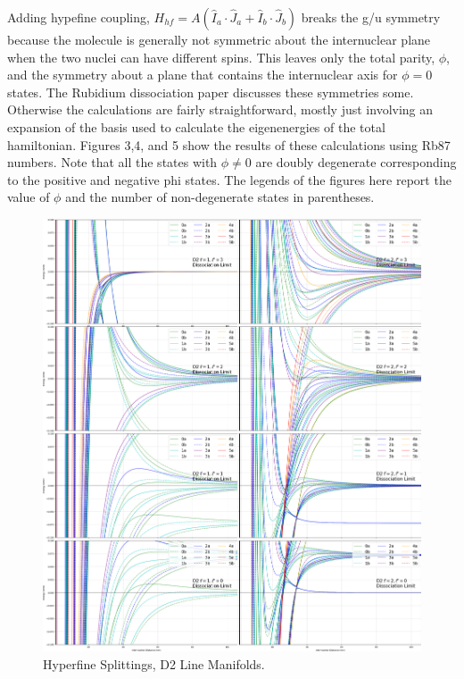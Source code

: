 \documentclass[prl, longbibliography]{revtex4-2}
\begin{document}
Adding hypefine coupling, $H_{hf} = A(\hat{I}_a\cdot\hat{J}_a+\hat{I}_b\cdot\hat{J}_b)$ breaks the g/u symmetry because the molecule is generally not symmetric about the internuclear plane when the two nuclei can have different spins. This leaves only the total parity, $\phi$, and the symmetry about a plane that contains the internuclear axis for $\phi=0$ states. The Rubidium dissociation paper\cite{kemmann_near-threshold_2004} discusses these symmetries some. Otherwise the calculations are fairly straightforward, mostly just involving an expansion of the basis used to calculate the eigenenergies of the total hamiltonian. Figures 3,4, and 5 show the results of these calculations using Rb87 numbers. Note that all the states with $\phi\neq 0$ are doubly degenerate corresponding to the positive and negative phi states. The legends of the figures here report the value of $\phi$ and the number of non-degenerate states in parentheses. 
\begin{figure}
  \centering
    \includegraphics[width=\textwidth]{Hyperfine_Splitting_D2_Zoom}
    \caption{Hyperfine Splittings, D2 Line Manifolds. }
\end{figure}
\end{document}
